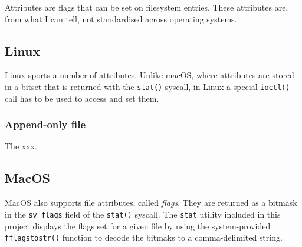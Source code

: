 \documentclass[a4paper]{article}
\begin{document}
Attributes are flags that can be set on filesystem entries. These attributes are, from what I can tell, not standardised across operating systems. 

\subsection{Linux}

Linux sports a number of attributes. Unlike macOS, where attributes are stored in a bitset that is returned with the \verb|stat()| syscall, in Linux a special \verb|ioctl()| call has to be used to access and set them.


\subsubsection{Append-only file}

The xxx.

\subsection{MacOS}



MacOS also supports file attributes, called \emph{flags}. They are returned as a bitmask in the \verb|sv_flags| field of the \verb|stat()| syscall. The \verb|stat| utility included in this project displays the flags set for a given file by using the system-provided \verb|fflagstostr()| function to decode the bitmaks to a comma-delimited string.
\end{document}
